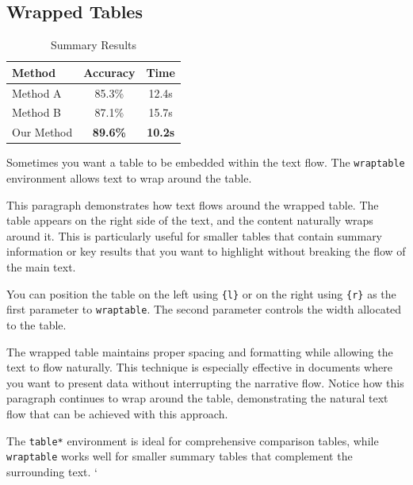 \documentclass[letterpaper,10pt]{article}
\begin{document}
\subsection{Wrapped Tables}
\label{sec:wrapped-tables}

\begin{table}
  \vspace{-2em}

  \centering
  \caption{Summary Results}
  \label{tab:wrap-example}

  \begin{tabular}{lcc}
    \toprule
    \textbf{Method} & \textbf{Accuracy} & \textbf{Time}  \\
    \midrule
    Method A        & 85.3\%            & 12.4s          \\
    Method B        & 87.1\%            & 15.7s          \\
    Our Method      & \textbf{89.6\%}   & \textbf{10.2s} \\
    \bottomrule
  \end{tabular}
\end{table}

Sometimes you want a table to be embedded within the text flow. The \texttt{wraptable} environment allows text to wrap around the table.

This paragraph demonstrates how text flows around the wrapped table. The table appears on the right side of the text, and the content naturally wraps around it. This is particularly useful for smaller tables that contain summary information or key results that you want to highlight without breaking the flow of the main text.

You can position the table on the left using \verb|{l}| or on the right using \verb|{r}| as the first parameter to \texttt{wraptable}. The second parameter controls the width allocated to the table.

The wrapped table maintains proper spacing and formatting while allowing the text to flow naturally. This technique is especially effective in documents where you want to present data without interrupting the narrative flow. Notice how this paragraph continues to wrap around the table, demonstrating the natural text flow that can be achieved with this approach.

\blindtext[1]

The \texttt{table*} environment is ideal for comprehensive comparison tables, while \texttt{wraptable} works well for smaller summary tables that complement the surrounding text.
`
\end{document}
